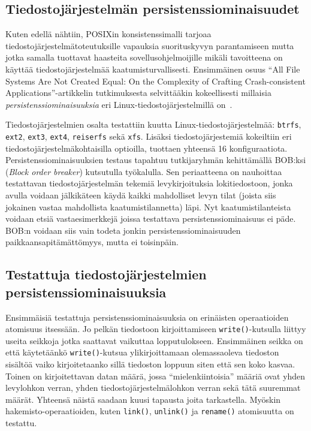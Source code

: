 \subsection{Tiedostojärjestelmän persistenssiominaisuudet}
Kuten edellä nähtiin, POSIXin konsistenssimalli tarjoaa tiedostojärjestelmätoteutuksille vapauksia suorituskyvyn parantamiseen
mutta jotka samalla tuottavat haasteita sovellusohjelmoijille mikäli tavoitteena on käyttää tiedostojärjestelmää kaatumisturvallisesti.
Ensimmäinen osuus ``All File Systems Are Not Created Equal: On the Complexity of Crafting Crash-consistent Applications''-artikkelin tutkimuksesta
selvittääkin kokeellisesti millaisia \emph{persistenssiominaisuuksia} eri Linux-tiedostojärjestelmillä on~\cite{PosixDataConsistency}.

Tiedostojärjestelmien osalta testattiin kuutta Linux-tiedostojärjestelmää: \texttt{btrfs}, \texttt{ext2}, \texttt{ext3}, \texttt{ext4}, \texttt{reiserfs} sekä \texttt{xfs}.
Lisäksi tiedostojärjestemiä kokeiltiin eri tiedostojärjestelmäkohtaisilla optioilla,
tuottaen yhteensä 16 konfiguraatiota.
Persistenssiominaisuuksien testaus tapahtuu tutkijaryhmän kehittämällä BOB:ksi (\emph{Block order breaker}) kutsutulla työkalulla.
Sen periaatteena on nauhoittaa testattavan tiedostojärjestelmän tekemiä levykirjoituksia lokitiedostoon,
jonka avulla voidaan jälkikäteen käydä kaikki mahdolliset levyn tilat (joista siis jokainen vastaa mahdollista kaatumistilannetta) läpi.
Nyt kaatumistilanteista voidaan etsiä vastaesimerkkejä joissa testattava persistenssiominaisuus ei päde.
BOB:n voidaan siis vain todeta jonkin persistenssiominaisuuden paikkaansapitämättömyys, mutta ei toisinpäin.

\subsection{Testattuja tiedostojärjestelmien persistenssiominaisuuksia}

Ensimmäisiä testattuja persistenssiominaisuuksia on erinäisten operaatioiden atomisuus itsessään.
Jo pelkän tiedostoon kirjoittamiseen \texttt{write()}-kutsulla liittyy useita seikkoja jotka saattavat vaikuttaa lopputulokseen.
Ensimmäinen seikka on että käytetäänkö \texttt{write()}-kutsua ylikirjoittamaan olemassaoleva tiedoston sisältöä vaiko kirjoitetaanko sillä tiedoston loppuun siten että sen koko kasvaa.
Toinen on kirjoitettavan datan määrä, jossa ``mielenkiintoisia'' määriä ovat yhden levylohkon verran,
yhden tiedostojärjestelmälohkon verran sekä tätä suuremmat määrät.
Yhteensä näistä saadaan kuusi tapausta joita tarkastella.
Myöskin hakemisto-operaatioiden,
kuten \texttt{link()}, \texttt{unlink()} ja \texttt{rename()} atomisuutta on testattu.

